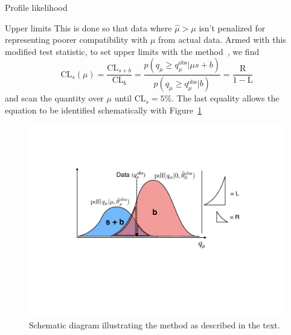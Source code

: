\begin{section}{Profile likelihood}
\begin{subsection}{Upper limits}
This is done so that data where $\hat{\mu}>\mu$ isn't penalized
for representing poorer compatibility with $\mu$ from actual data.
Armed with this modified test statistic,
to set upper limits with the 
\CLs method~\cite{STAT:Junk1999kv,STAT:Read2002hq,STAT:ATLPHYSPUB2011011,STAT:Cowan2010js},
we find
\begin{equation}
\mathrm{CL}_s(\mu) 
= \frac{\mathrm{CL}_{s+b}}{\mathrm{CL}_{b}}
= \frac{p(q_\mu \geq q_\mu^\text{obs} | \mu s + b)}{p(q_\mu \geq q_\mu^\text{obs} | b)}
= \frac{\text{R}}{1-\text{L}}
\end{equation}
and scan the quantity over $\mu$ until $\mathrm{CL}_s = 5\%$.
The last equality allows the equation to be identified schematically
with Figure~\ref{fig:ulschematic}
\begin{figure}[!htb]
    \centering
    \includegraphics[width=0.85\linewidth]{figs/toy_statistics/ulschematic.pdf}
    \caption{
        Schematic diagram illustrating the \CLs method as described in the text.
    }
    \label{fig:ulschematic}
\end{figure}


\end{subsection}


\end{section}
